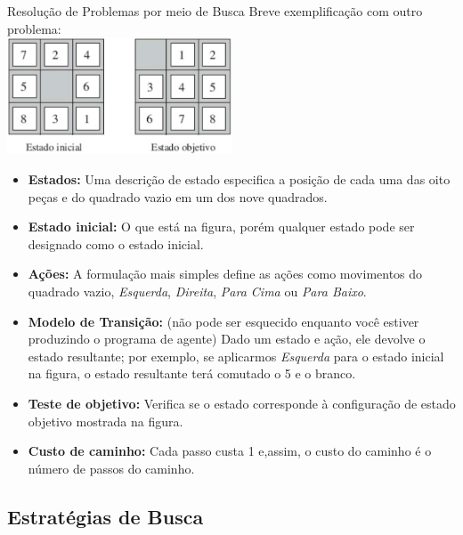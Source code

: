 \documentclass{libs/ufc_format}
\begin{document}
\begin{frame}{Resolução de Problemas por meio de Busca}
\centering
    Breve exemplificação com outro problema:\\
    \includegraphics[width=0.5\textwidth]{figuras/figura09}
    \begin{itemize}
        \scriptsize
        \justifying
        \item<1-3> \textbf{Estados:} Uma descrição de estado especifica a posição de cada uma das oito peças e do quadrado vazio em um dos nove quadrados.
        \item<2-4> \textbf{Estado inicial:} O que está na figura, porém qualquer estado pode ser designado como o estado inicial.
        \item<3-5> \textbf{Ações:} A formulação mais simples define as ações como movimentos do quadrado vazio, \textit{Esquerda}, \textit{Direita}, \textit{Para Cima} ou \textit{Para Baixo}.
        \item<4-6> \textbf{Modelo de Transição:} (não pode ser esquecido enquanto você estiver produzindo o programa de agente) Dado um estado e ação, ele devolve o estado resultante; por exemplo, se aplicarmos \textit{Esquerda} para o estado inicial na figura, o estado resultante terá comutado o 5 e o branco.
        \item<5-> \textbf{Teste de objetivo:} Verifica se o estado corresponde à configuração de estado objetivo mostrada na figura.
        \item<6> \textbf{Custo de caminho:} Cada passo custa 1 e,assim, o custo do caminho é o número de passos do caminho.
    \end{itemize}
\end{frame}

\subsection{Estratégias de Busca}
\end{document}
